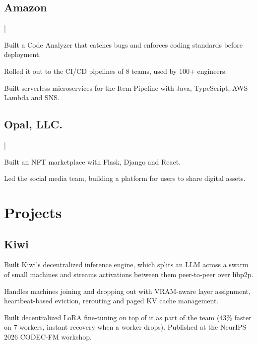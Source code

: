 \documentclass[]{deedy-resume-openfont}
\begin{document}
\subsection*{Amazon}
\medspace|\medspace
{}
\vspace{\topsep}
\begin{tightemize}
\item Built a Code Analyzer that catches bugs and enforces coding standards before deployment.
\item Rolled it out to the CI/CD pipelines of 8 teams, used by 100+ engineers.
\item Built serverless microservices for the Item Pipeline with Java, TypeScript, AWS Lambda and SNS.
\end{tightemize}
\sectionsep

\subsection*{Opal, LLC.}
\medspace|\medspace
{}
\vspace{\topsep}
\begin{tightemize}
\item Built an NFT marketplace with Flask, Django and React.
\item Led the social media team, building a platform for users to share digital assets.
\end{tightemize}
\sectionsep

\section{Projects}

\subsection*{Kiwi}
\vspace{\topsep}
\begin{tightemize}
\item Built Kiwi's decentralized inference engine, which splits an LLM across a swarm of small machines and streams activations between them peer-to-peer over libp2p.
\item Handles machines joining and dropping out with VRAM-aware layer assignment, heartbeat-based eviction, rerouting and paged KV cache management.
\item Built decentralized LoRA fine-tuning on top of it as part of the team (43\% faster on 7 workers, instant recovery when a worker drops). Published at the NeurIPS 2026 CODEC-FM workshop.
\end{tightemize}
\sectionsep
\end{document}
